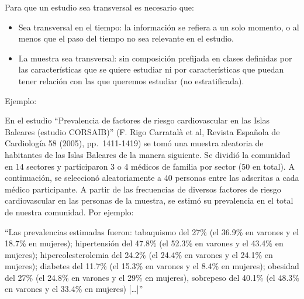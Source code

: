 \documentclass[
  spanish,
  letterpaper,
  DIV=11,
  numbers=noendperiod]{scrreprt}
\begin{document}
\begin{tcolorbox}[enhanced jigsaw, arc=.35mm, bottomrule=.15mm, bottomtitle=1mm, breakable, colback=white, colbacktitle=quarto-callout-note-color!10!white, colframe=quarto-callout-note-color-frame, coltitle=black, left=2mm, leftrule=.75mm, opacityback=0, opacitybacktitle=0.6, rightrule=.15mm, title=\textcolor{quarto-callout-note-color}{\faInfo}\hspace{0.5em}{Nota}, titlerule=0mm, toprule=.15mm, toptitle=1mm]

Para que un estudio sea transversal es necesario que:

\begin{itemize}
\item
  Sea transversal en el tiempo: la información se refiera a un solo
  momento, o al menos que el paso del tiempo no sea relevante en el
  estudio.
\item
  La muestra sea transversal: sin composición prefijada en clases
  definidas por las características que se quiere estudiar ni por
  características que puedan tener relación con las que queremos
  estudiar (no estratificada).
\end{itemize}

\end{tcolorbox}

Ejemplo:

En el estudio ``Prevalencia de factores de riesgo cardiovascular en las
Islas Baleares (estudio CORSAIB)'' (F. Rigo Carratalà et al, Revista
Española de Cardiología 58 (2005), pp.~1411-1419) se tomó una muestra
aleatoria de habitantes de las Islas Baleares de la manera siguiente. Se
dividió la comunidad en 14 sectores y participaron 3 o 4 médicos de
familia por sector (50 en total). A continuación, se seleccionó
aleatoriamente a 40 personas entre las adscritas a cada médico
participante. A partir de las frecuencias de diversos factores de riesgo
cardiovascular en las personas de la muestra, se estimó su prevalencia
en el total de nuestra comunidad. Por ejemplo:

``Las prevalencias estimadas fueron: tabaquismo del 27\% (el 36.9\% en
varones y el 18.7\% en mujeres); hipertensión del 47.8\% (el 52.3\% en
varones y el 43.4\% en mujeres); hipercolesterolemia del 24.2\% (el
24.4\% en varones y el 24.1\% en mujeres); diabetes del 11.7\% (el
15.3\% en varones y el 8.4\% en mujeres); obesidad del 27\% (el 24.8\%
en varones y el 29\% en mujeres), sobrepeso del 40.1\% (el 48.3\% en
varones y el 33.4\% en mujeres) {[}\ldots{]}''
\end{document}
